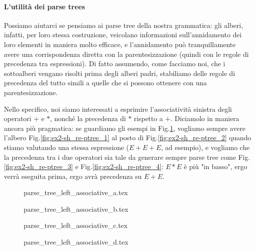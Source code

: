 \documentclass[class=book, crop=false, oneside, 12pt]{standalone}
\begin{document}
\paragraph{L'utilità dei parse trees}
Possiamo aiutarci se pensiamo ai parse tree della nostra grammatica: gli alberi, infatti, per loro stessa costruzione, veicolano informazioni sull'annidamento dei loro elementi in maniera molto efficace, e l'annidamento può tranquillamente avere una corrispondenza diretta con la parentesizzazione (quindi con le regole di precedenza tra espressioni). Di fatto assumendo, come facciamo noi, che i sottoalberi vengano risolti prima degli alberi padri, stabiliamo delle regole di precedenza del tutto simili a quelle che si possono ottenere con una parentesizzazione.

Nello specifico, noi siamo interessati a esprimire l'associatività sinistra degli operatori \(+\) e \(*\), nonché la precedenza di \(*\) rispetto a \(+\). Diciamolo in maniera ancora più pragmatica: se guardiamo gli esempi in Fig.\ref{fig:ex2-sh_re-ptree}, vogliamo sempre avere l'albero Fig.\ref{fig:ex2-sh_re-ptree_1} al posto di Fig.\ref{fig:ex2-sh_re-ptree_2} quando stiamo valutando una stessa espressione (\(E + E + E\), ad esempio), e vogliamo che la precedenza tra i due operatori sia tale da generare sempre parse tree come Fig.\ref{fig:ex2-sh_re-ptree_3} e Fig.\ref{fig:ex2-sh_re-ptree_4}: \(E*E\) è più "in basso", ergo verrà eseguita prima, ergo avrà precedenza su \(E+E\).
\begin{figure}[H]
    \begin{minipage}[b]{.4\textwidth}
        \centering
        {parse_tree_left_associative_a.tex}
        \label{fig:ex2-sh_re-ptree_1}
    \end{minipage}
    \hfill
    \begin{minipage}[b]{.4\textwidth}
        \centering
        {parse_tree_left_associative_b.tex}
        \label{fig:ex2-sh_re-ptree_2}
    \end{minipage}
    
    \begin{minipage}[b]{.4\textwidth}
        \centering
        {parse_tree_left_associative_c.tex}
        \label{fig:ex2-sh_re-ptree_3}
    \end{minipage}
    \hfill
    \begin{minipage}[b]{.4\textwidth}
        \centering
        {parse_tree_left_associative_d.tex}
        \label{fig:ex2-sh_re-ptree_4}
    \end{minipage}
    \caption{}
    \label{fig:ex2-sh_re-ptree}
\end{figure}
\end{document}
